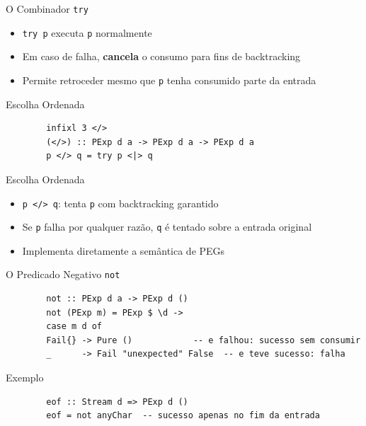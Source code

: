 \begin{frame}[fragile]{O Combinador \texttt{try}}

    \begin{itemize}

        \item
        \texttt{try p} executa \texttt{p}
        normalmente
        \item
        Em caso de falha, \textbf{cancela} o consumo para fins de backtracking
        \item
        Permite retroceder mesmo que \texttt{p} tenha
        consumido parte da entrada
    \end{itemize}
\end{frame}

\begin{frame}[fragile]{Escolha Ordenada}

    \begin{lstlisting}
        infixl 3 </>
        (</>) :: PExp d a -> PExp d a -> PExp d a
        p </> q = try p <|> q
    \end{lstlisting}
\end{frame}

\begin{frame}[fragile]{Escolha Ordenada}

    \begin{itemize}

        \item
        \texttt{p </> q}: tenta \texttt{p}
        com backtracking garantido
        \item
        Se \texttt{p} falha por qualquer razão,
        \texttt{q} é tentado sobre a entrada original
        \item
        Implementa diretamente a semântica de PEGs
    \end{itemize}
\end{frame}

\begin{frame}[fragile]{O Predicado Negativo
    \texttt{not}}

    \begin{lstlisting}
        not :: PExp d a -> PExp d ()
        not (PExp m) = PExp $ \d ->
        case m d of
        Fail{} -> Pure ()            -- e falhou: sucesso sem consumir
        _      -> Fail "unexpected" False  -- e teve sucesso: falha
    \end{lstlisting}
\end{frame}

\begin{frame}[fragile]{Exemplo}

    \begin{lstlisting}
        eof :: Stream d => PExp d ()
        eof = not anyChar  -- sucesso apenas no fim da entrada
    \end{lstlisting}
\end{frame}

